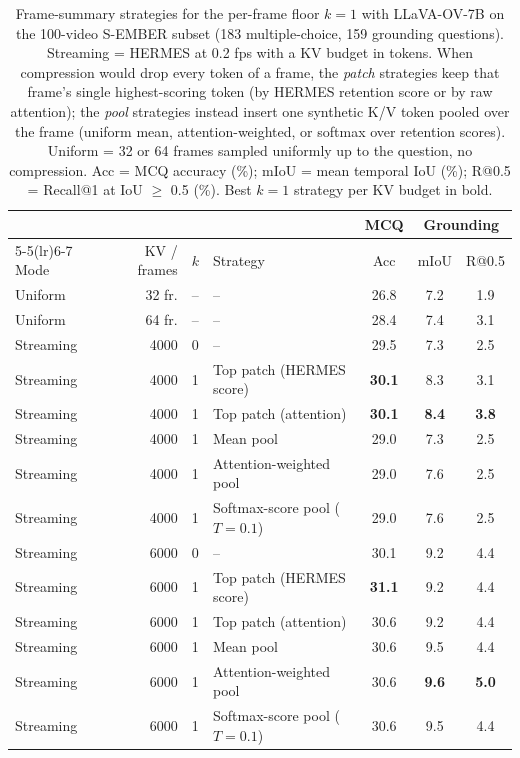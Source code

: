 \begin{table}[t]
\centering
\small
\caption{Frame-summary strategies for the per-frame floor $k{=}1$ with LLaVA-OV-7B on the 100-video S-EMBER subset (183 multiple-choice, 159 grounding questions). Streaming = HERMES at 0.2 fps with a KV budget in tokens. When compression would drop every token of a frame, the \emph{patch} strategies keep that frame's single highest-scoring token (by HERMES retention score or by raw attention); the \emph{pool} strategies instead insert one synthetic K/V token pooled over the frame (uniform mean, attention-weighted, or softmax over retention scores). Uniform = 32 or 64 frames sampled uniformly up to the question, no compression. Acc = MCQ accuracy (\%); mIoU = mean temporal IoU (\%); R@0.5 = Recall@1 at IoU $\geq$ 0.5 (\%). Best $k{=}1$ strategy per KV budget in bold.}
\label{tab:sember-k1-strategies}
\begin{tabular}{lrclccc}
\toprule
& & & & MCQ & \multicolumn{2}{c}{Grounding} \\
\cmidrule(lr){5-5}\cmidrule(lr){6-7}
Mode & KV / frames & $k$ & Strategy & Acc & mIoU & R@0.5 \\
\midrule
Uniform & 32 fr. & -- & -- & 26.8 & 7.2 & 1.9 \\
Uniform & 64 fr. & -- & -- & 28.4 & 7.4 & 3.1 \\
\midrule
Streaming & 4000 & 0 & -- & 29.5 & 7.3 & 2.5 \\
Streaming & 4000 & 1 & Top patch (HERMES score) & \textbf{30.1} & 8.3 & 3.1 \\
Streaming & 4000 & 1 & Top patch (attention) & \textbf{30.1} & \textbf{8.4} & \textbf{3.8} \\
Streaming & 4000 & 1 & Mean pool & 29.0 & 7.3 & 2.5 \\
Streaming & 4000 & 1 & Attention-weighted pool & 29.0 & 7.6 & 2.5 \\
Streaming & 4000 & 1 & Softmax-score pool ($T{=}0.1$) & 29.0 & 7.6 & 2.5 \\
\midrule
Streaming & 6000 & 0 & -- & 30.1 & 9.2 & 4.4 \\
Streaming & 6000 & 1 & Top patch (HERMES score) & \textbf{31.1} & 9.2 & 4.4 \\
Streaming & 6000 & 1 & Top patch (attention) & 30.6 & 9.2 & 4.4 \\
Streaming & 6000 & 1 & Mean pool & 30.6 & 9.5 & 4.4 \\
Streaming & 6000 & 1 & Attention-weighted pool & 30.6 & \textbf{9.6} & \textbf{5.0} \\
Streaming & 6000 & 1 & Softmax-score pool ($T{=}0.1$) & 30.6 & 9.5 & 4.4 \\
\bottomrule
\end{tabular}
\end{table}
